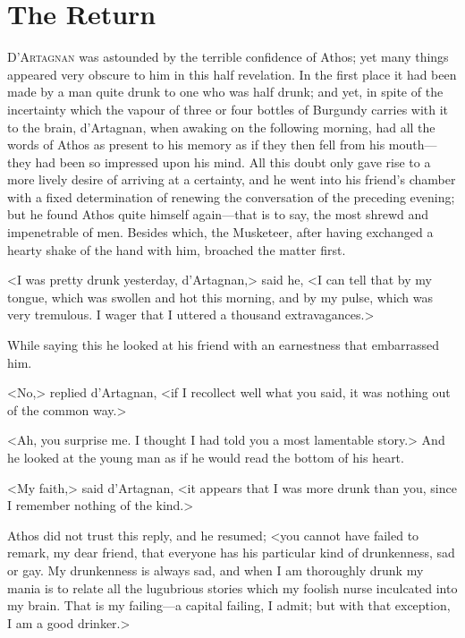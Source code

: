 
\chapter{The Return} 
	
\lettrine[]{D}{'Artagnan} was astounded by the terrible confidence of Athos; yet many things appeared very obscure to him in this half revelation. In the first place it had been made by a man quite drunk to one who was half drunk; and yet, in spite of the incertainty which the vapour of three or four bottles of Burgundy carries with it to the brain, d'Artagnan, when awaking on the following morning, had all the words of Athos as present to his memory as if they then fell from his mouth---they had been so impressed upon his mind. All this doubt only gave rise to a more lively desire of arriving at a certainty, and he went into his friend's chamber with a fixed determination of renewing the conversation of the preceding evening; but he found Athos quite himself again---that is to say, the most shrewd and impenetrable of men. Besides which, the Musketeer, after having exchanged a hearty shake of the hand with him, broached the matter first. 

<I was pretty drunk yesterday, d'Artagnan,> said he, <I can tell that by my tongue, which was swollen and hot this morning, and by my pulse, which was very tremulous. I wager that I uttered a thousand extravagances.> 

While saying this he looked at his friend with an earnestness that embarrassed him. 

<No,> replied d'Artagnan, <if I recollect well what you said, it was nothing out of the common way.> 

<Ah, you surprise me. I thought I had told you a most lamentable story.> And he looked at the young man as if he would read the bottom of his heart. 

<My faith,> said d'Artagnan, <it appears that I was more drunk than you, since I remember nothing of the kind.> 

Athos did not trust this reply, and he resumed; <you cannot have failed to remark, my dear friend, that everyone has his particular kind of drunkenness, sad or gay. My drunkenness is always sad, and when I am thoroughly drunk my mania is to relate all the lugubrious stories which my foolish nurse inculcated into my brain. That is my failing---a capital failing, I admit; but with that exception, I am a good drinker.> 

